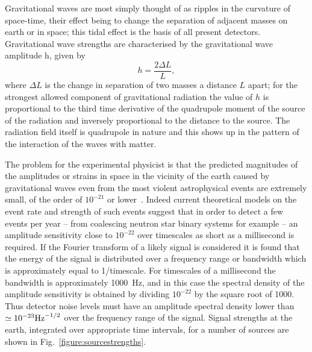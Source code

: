 \documentclass{article}
\begin{document}
Gravitational waves are most simply thought of as ripples in the curvature of
space-time, their effect being to change the separation of adjacent masses on
earth or in space; this tidal effect is the basis of all present detectors.
Gravitational wave strengths are characterised by the gravitational wave
amplitude h, given by
%
\begin{equation}
  h = \frac{2 \Delta L} L,
  \label{equation:h}
\end{equation}
%
where $\Delta L$ is the change in separation of two masses a distance $L$ apart;
for the strongest allowed component of gravitational radiation the value of $h$
is proportional to the third time derivative of the quadrupole moment of the
source of the radiation and inversely proportional to the distance to the
source. The radiation field itself is quadrupole in nature and this shows up in
the pattern of the interaction of the waves with matter.

The problem for the experimental physicist is that the predicted magnitudes of
the amplitudes or strains in space in the vicinity of the earth caused by
gravitational waves even from the most violent astrophysical events are
extremely small, of the order of $10^{-21}$ or lower~\cite{Sathyaprakash:2009,
LISAsymposium}. Indeed current theoretical models on the event rate and strength
of such events suggest that in order to detect a few events per year -- from
coalescing neutron star binary systems for example -- an amplitude sensitivity
close to $10^{-22}$ over timescales as short as a millisecond is required. If
the Fourier transform of a likely signal is considered it is found that the
energy of the signal is distributed over a frequency range or bandwidth which is
approximately equal to 1/timescale.  For timescales of a millisecond the
bandwidth is approximately 1000~Hz, and in this case the spectral density of the
amplitude sensitivity is obtained by dividing $10^{-22}$ by the square root of
1000. Thus detector noise levels must have an amplitude spectral density lower
than $\simeq 10^{-23}{\rm Hz}^{-1/2}$ over the frequency range of the signal.
Signal strengths at the earth, integrated over appropriate time intervals, for a
number of sources are shown in Fig.~\ref{figure:sourcestrengths}.
\end{document}
